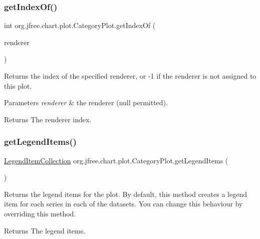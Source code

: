\subsubsection{\texorpdfstring{get\+Index\+Of()}{getIndexOf()}}
{\footnotesize\ttfamily int org.\+jfree.\+chart.\+plot.\+Category\+Plot.\+get\+Index\+Of (\begin{DoxyParamCaption}\item[{\mbox{\hyperlink{interfaceorg_1_1jfree_1_1chart_1_1renderer_1_1category_1_1_category_item_renderer}{Category\+Item\+Renderer}}}]{renderer }\end{DoxyParamCaption})}

Returns the index of the specified renderer, or {\ttfamily -\/1} if the renderer is not assigned to this plot.


\begin{DoxyParams}{Parameters}
{\em renderer} & the renderer ({\ttfamily null} permitted).\\
\hline
\end{DoxyParams}
\begin{DoxyReturn}{Returns}
The renderer index. 
\end{DoxyReturn}
\mbox{\label{classorg_1_1jfree_1_1chart_1_1plot_1_1_category_plot_a35e0a11b3c2ec63f53262b47ab80abbe}} 
\subsubsection{\texorpdfstring{get\+Legend\+Items()}{getLegendItems()}}
{\footnotesize\ttfamily \mbox{\hyperlink{classorg_1_1jfree_1_1chart_1_1_legend_item_collection}{Legend\+Item\+Collection}} org.\+jfree.\+chart.\+plot.\+Category\+Plot.\+get\+Legend\+Items (\begin{DoxyParamCaption}{ }\end{DoxyParamCaption})}

Returns the legend items for the plot. By default, this method creates a legend item for each series in each of the datasets. You can change this behaviour by overriding this method.

\begin{DoxyReturn}{Returns}
The legend items. 
\end{DoxyReturn}


